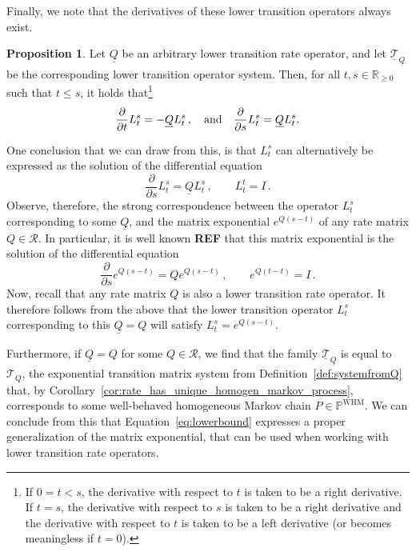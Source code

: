 \documentclass[10pt,a4paper]{paper}
\theoremstyle{definition}
\newtheorem{proposition}[theorem]{Proposition}
\newcommand{\reals}{\mathbb{R}}
\newcommand{\realsnonneg}{\reals_{\geq 0}}
\newcommand{\processes}{\mathbb{P}}
\newcommand{\whmprocesses}{\processes^{\mathrm{WHM}}}
\newcommand{\lbound}{L}
\newcommand{\lrate}{\underline{Q}}
\begin{document}
Finally, we note that the derivatives of these lower transition operators always exist.

\begin{proposition}\label{prop:lower_transition_has_deriv}
Let $\lrate$ be an arbitrary lower transition rate operator, and let $\underline{\mathcal{T}}_{\lrate}$ be the corresponding lower transition operator system. Then, for all $t,s\in\realsnonneg$ such that $t\leq s$, it holds that\footnote{If $0=t<s$, the derivative with respect to $t$ is taken to be a right derivative. If $t=s$, the derivative with respect to $s$ is taken to be a right derivative and the derivative with respect to $t$ is taken to be a left derivative (or becomes meaningless if $t=0$).}
\begin{equation*}
\frac{\partial}{\partial t}\lbound_t^s=-\lrate\lbound_t^s\,,\quad\text{and}\quad\frac{\partial}{\partial s}\lbound_t^s=\lrate\lbound_t^s.\vspace{7pt}
\end{equation*}
\end{proposition}

One conclusion that we can draw from this, is that $L_t^s$ can alternatively be expressed as the solution of the differential equation
\begin{equation*}
\frac{\partial}{\partial s}L_t^s=\lrate L_t^s\,,\quad\quad L_t^t=I\,.
\end{equation*}
Observe, therefore, the strong correspondence between the operator $L_t^s$ corresponding to some $\lrate$, and the matrix exponential $e^{Q(s-t)}$ of any rate matrix $Q\in\mathcal{R}$. In particular, it is well known {\bf REF} that this matrix exponential is the solution of the differential equation
\begin{equation*}
\frac{\partial}{\partial s}e^{Q(s-t)}=Qe^{Q(s-t)}\,,\quad\quad e^{Q(t-t)}=I\,.
\end{equation*}
Now, recall that any rate matrix $Q$ is also a lower transition rate operator. It therefore follows from the above that the lower transition operator $L_t^s$ corresponding to this $\lrate=Q$ will satisfy $L_t^s=e^{Q(s-t)}$. 

Furthermore, if $\lrate=Q$ for some $Q\in\mathcal{R}$, we find that the family $\underline{\mathcal{T}}_{\lrate}$ is equal to $\mathcal{T}_Q$, the exponential transition matrix system from Definition~\ref{def:systemfromQ} that, by Corollary~\ref{cor:rate_has_unique_homogen_markov_process}, corresponds to some well-behaved homogeneous Markov chain $P\in\whmprocesses$. We can conclude from this that Equation~\eqref{eq:lowerbound} expresses a proper generalization of the matrix exponential, that can be used when working with lower transition rate operators.
\end{document}

